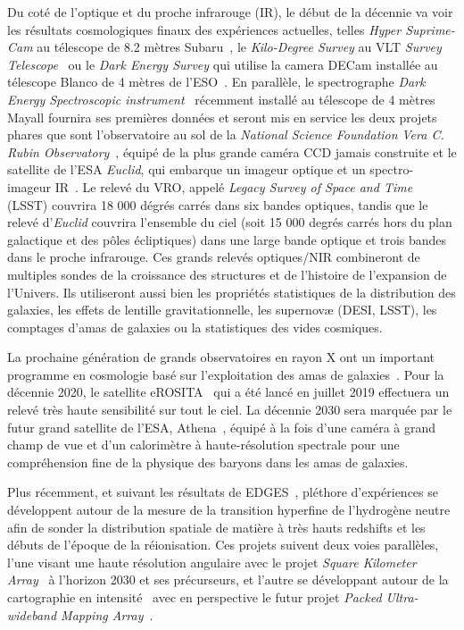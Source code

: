 Du coté de l'optique et du proche infrarouge (IR), le début de la
décennie va voir les résultats cosmologiques finaux des expériences
actuelles, telles \emph{Hyper Suprime-Cam} au télescope de 8.2 mètres
Subaru~\citep[HSC, ][]{SUBARU2018}, le \emph{Kilo-Degree Survey} au
VLT \emph{Survey Telescope}~\citep[KiDS, ][]{KiDS2013} ou le \emph{Dark Energy
Survey} qui utilise la camera DECam installée au télescope Blanco de 4 mètres
de l'ESO~\citep[DES, ][]{DES2016}. En parallèle, le
spectrographe \emph{Dark Energy Spectroscopic instrument}~\citep[DESI,
][]{DESI2016}
récemment installé au télescope de 4 mètres Mayall fournira ses
premières données et seront mis en
service les deux projets phares que sont l'observatoire au sol de la \emph{National Science Foundation} \emph{Vera C. Rubin Observatory}~\citep[VRO, anciennement LSST, ][]{LSST2009}, équipé de la plus grande caméra CCD jamais construite %
et le satellite de l'ESA \emph{Euclid}, qui embarque
un imageur optique et un spectro-imageur IR~\citep{EUCLID2011}. Le relevé du VRO, appelé \emph{Legacy Survey of Space and Time} (LSST) couvrira 18 000 dégrés carrés dans six bandes optiques, tandis que le relevé d'\emph{Euclid} couvrira l'ensemble du ciel (soit 15 000 degrés carrés hors du plan galactique et des pôles écliptiques) dans une large bande optique et trois bandes dans le proche infrarouge.    
Ces grands relevés optiques/NIR combineront de multiples sondes de la
croissance des structures et de l'histoire de l'expansion de l'Univers.
Ils utiliseront aussi bien les propriétés statistiques de la distribution
des galaxies, les effets de lentille gravitationnelle, les supernovæ
(DESI, LSST), les comptages d'amas de galaxies ou la statistiques des vides
cosmiques. 

La prochaine génération de grands observatoires en rayon X ont un
important programme en cosmologie basé sur l'exploitation des amas de
galaxies~\citep{eROSITA_cosmo}. Pour la décennie 2020, le satellite
eROSITA~\citep{eROSITA2014} qui a été lancé en juillet 2019 effectuera
un relevé très haute sensibilité sur tout le ciel. La décennie 2030
sera marquée par le futur grand satellite de l'ESA,
Athena~\citep{ATHENA2013},
équipé à la fois d'une caméra à grand champ de vue et d'un calorimètre
à haute-résolution spectrale pour une compréhension fine de la
physique des baryons dans les amas de galaxies. 

Plus récemment, et suivant les résultats de
EDGES~\citep{EDGES2018Natur}, pléthore d'expériences se développent
autour de la mesure de la transition hyperfine de l'hydrogène neutre
afin de sonder la distribution spatiale de matière à très hauts
redshifts et les débuts
de l'époque de la réionisation. Ces projets suivent deux voies
parallèles, l'une visant une haute résolution angulaire avec le projet
\emph{Square Kilometer Array}~\citep[SKA][]{SKA2018} à l'horizon 2030 et ses
précurseurs, et l'autre se développant autour de la cartographie en
intensité~\citep[par exemple][]{TIANLAI2018, HIRAX2016} avec en perspective le
futur projet \emph{Packed Ultra-wideband Mapping
Array}~\citep[PUMA,][]{PUMA2019}.\\

